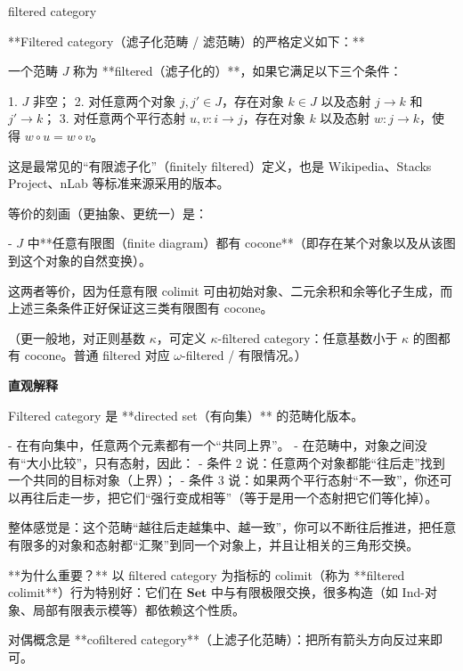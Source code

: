 \documentclass{beamer}
\begin{document}
\begin{frame}{filtered category}
\begin{markdown}
**Filtered category（滤子化范畴 / 滤范畴）的严格定义如下：**

一个范畴 $J$ 称为 **filtered（滤子化的）**，如果它满足以下三个条件：

1. $J$ 非空；
2. 对任意两个对象 $j, j' \in J$，存在对象 $k \in J$ 以及态射 $j \to k$ 和 $j' \to k$；
3. 对任意两个平行态射 $u, v : i \to j$，存在对象 $k$ 以及态射 $w : j \to k$，使得 $w \circ u = w \circ v$。

这是最常见的“有限滤子化”（finitely filtered）定义，也是 Wikipedia、Stacks Project、nLab 等标准来源采用的版本。

等价的刻画（更抽象、更统一）是：

- $J$ 中**任意有限图（finite diagram）都有 cocone**（即存在某个对象以及从该图到这个对象的自然变换）。

这两者等价，因为任意有限 colimit 可由初始对象、二元余积和余等化子生成，而上述三条条件正好保证这三类有限图有 cocone。

（更一般地，对正则基数 $\kappa$，可定义 $\kappa$-filtered category：任意基数小于 $\kappa$ 的图都有 cocone。普通 filtered 对应 $\omega$-filtered / 有限情况。）

\textbf{直观解释}

Filtered category 是 **directed set（有向集）** 的范畴化版本。

- 在有向集中，任意两个元素都有一个“共同上界”。
- 在范畴中，对象之间没有“大小比较”，只有态射，因此：
  - 条件 2 说：任意两个对象都能“往后走”找到一个共同的目标对象（上界）；
  - 条件 3 说：如果两个平行态射“不一致”，你还可以再往后走一步，把它们“强行变成相等”（等于是用一个态射把它们等化掉）。

整体感觉是：这个范畴“越往后走越集中、越一致”，你可以不断往后推进，把任意有限多的对象和态射都“汇聚”到同一个对象上，并且让相关的三角形交换。

**为什么重要？**  
以 filtered category 为指标的 colimit（称为 **filtered colimit**）行为特别好：它们在 $\mathbf{Set}$ 中与有限极限交换，很多构造（如 Ind-对象、局部有限表示模等）都依赖这个性质。

对偶概念是 **cofiltered category**（上滤子化范畴）：把所有箭头方向反过来即可。
\end{markdown}
\end{frame}
\end{document}
